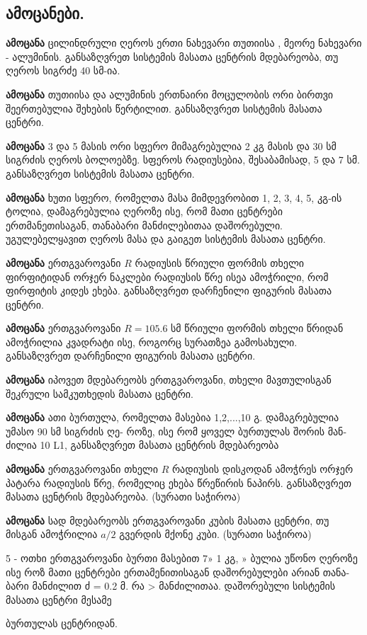 \documentclass[a4paper]{book}
\begin{document}
\subsection{ამოცანები.}
\textbf{ამოცანა} ცილინდრული ღეროს ერთი ნახევარი თუთიისა , მეორე ნახევარი - ალუმინის. განსაზღვრეთ სისტემის მასათა ცენტრის მდებარეობა, თუ ღეროს სიგრძე 40 სმ-ია.

\textbf{ამოცანა} თუთიისა და ალუმინის ერთნაირი მოცულობის ორი ბირთვი შეერთებულია შეხების წერტილით. განსაზღვრეთ სისტემის მასათა ცენტრი.

\textbf{ამოცანა} 3 და 5 მასის ორი სფერო მიმაგრებულია 2 კგ მასის და 30 სმ სიგრძის ღეროს ბოლოებზე. სფეროს რადიუსებია, შესაბამისად, 5 და 7 სმ. განსაზღვრეთ სისტემის მასათა ცენტრი.

\textbf{ამოცანა}  ხუთი სფერო, რომელთა მასა მიმდევრობით 1, 2, 3, 4, 5, კგ-ის ტოლია, დამაგრებულია ღეროზე ისე, რომ მათი ცენტრები ერთმანეთისაგან, თანაბარი მანძილებითაა დაშორებული. უგულებელყავით ღეროს მასა და გაიგეთ სისტემის მასათა ცენტრი.

\textbf{ამოცანა} ერთგვაროვანი $R$ რადიუსის წრიული ფორმის თხელი ფირფიტიდან ორჯერ ნაკლები რადიუსის წრე ისეა ამოჭრილი, რომ ფირფიტის კიდეს ეხება. განსაზღვრეთ დარჩენილი ფიგურის მასათა ცენტრი.

\textbf{ამოცანა} ერთგვაროვანი $R = 105.6$ სმ წრიული ფორმის თხელი წრიდან ამოჭრილია კვადრატი ისე, როგორც სურათზეა გამოსახული.
განსაზღვრეთ დარჩენილი ფიგურის მასათა ცენტრი.

\textbf{ამოცანა} იპოვეთ მდებარეობს ერთგვაროვანი, თხელი მავთულისგან შეკრული სამკუთხედის მასათა ცენტრი.

\textbf{ამოცანა} ათი ბურთულა, რომელთა მასებია 1,2,...,10
გ. დამაგრებულია უმასო 90 სმ სიგრძის ღე-
როზე, ისე რომ ყოველ ბურთულას შორის მან-
ძილია 10 L1, განსაზღვრეთ მასათა ცენტრის
მდებარეობა

\textbf{ამოცანა} ერთგვაროვანი თხელი $R$ რადიუსის დისკოდან ამოჭრეს ორჯერ პატარა რადიუსის წრე, რომელიც ეხება წრეწირის ნაპირს. განსაზღვრეთ მასათა ცენტრის მდებარეობა. (სურათი საჭიროა)

\textbf{ამოცანა} სად მდებარეობს ერთგვაროვანი კუბის მასათა ცენტრი, თუ მისგან ამოჭრილია $a/2$ გვერდის მქონე კუბი. (სურათი საჭიროა)

 

5 - ოთხი ერთგვაროვანი ბურთი მასებით 7»
1 კგ, »%
ბულია უწონო ღეროზე ისე როზ მათი ცენტრები
ერთამენითისაგან დაშორებულები არიან თანა-
ბარი მანძილით ძ = 0.2 მ. რა > მანძილითაა.
დაშორებული სისტემის მასათა ცენტრი მესამე

ბურთულას ცენტრიდან.
\end{document}
